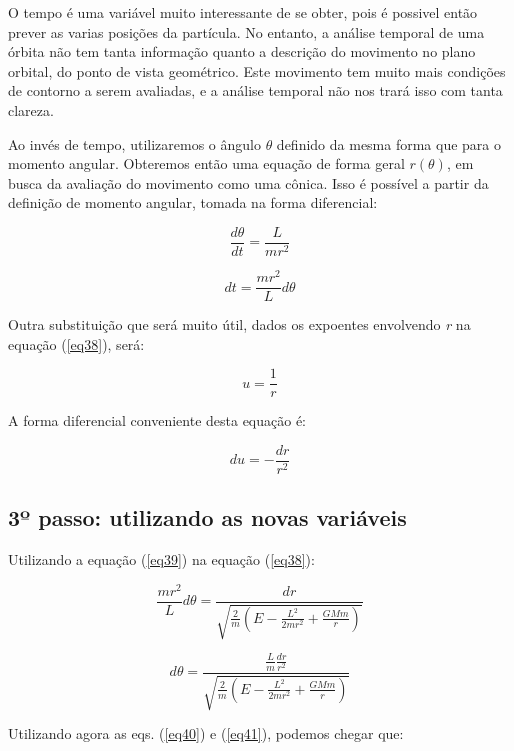 O tempo é uma variável muito interessante de se obter, pois é possivel então prever as varias posições da partícula. No entanto, a análise temporal de uma órbita não tem tanta informação quanto a descrição do movimento no plano orbital, do ponto de vista geométrico. Este movimento tem muito mais condições de contorno a serem avaliadas, e a análise temporal não nos trará isso com tanta clareza. {\\}

Ao invés de tempo, utilizaremos o ângulo $\theta$ definido da mesma forma que para o momento angular. Obteremos então uma equação de forma geral $r(\theta)$, em busca da avaliação do movimento como uma cônica. Isso é possível a partir da definição de momento angular, tomada na forma diferencial:

\[
	\frac{d\theta}{dt} = \frac{L}{mr^2}
\]

\begin{equation}
	dt = \frac{mr^2}{L}d\theta \label{eq39}
\end{equation}

Outra substituição que será muito útil, dados os expoentes envolvendo \textit{r} na equação (\ref{eq38}), será:

\begin{equation}
	u = \frac{1}{r} \label{eq40}
\end{equation}

A forma diferencial conveniente desta equação é:

\begin{equation}
	du = -\frac{dr}{r^2} \label{eq41}
\end{equation}

\subsection{3º passo: utilizando as novas variáveis}

Utilizando a equação (\ref{eq39}) na equação (\ref{eq38}):

\[
	\frac{mr^2}{L}d\theta = \frac{dr}{\sqrt{\frac{2}{m}\left(E - \frac{L^2}{2mr^2} + \frac{GMm}{r}\right)}}
\]

\begin{equation}
	d\theta = \frac{\frac{L}{m}\frac{dr}{r^2}}{\sqrt{\frac{2}{m}\left(E - \frac{L^2}{2mr^2} + \frac{GMm}{r}\right)}} \label{eq42}
\end{equation}

Utilizando agora as eqs. (\ref{eq40}) e (\ref{eq41}), podemos chegar que:  

